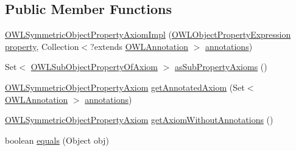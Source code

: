 \subsection*{Public Member Functions}
\begin{DoxyCompactItemize}
\item 
\hyperlink{classuk_1_1ac_1_1manchester_1_1cs_1_1owl_1_1owlapi_1_1_o_w_l_symmetric_object_property_axiom_impl_ab8c5ea0702345484e1981a1626f501de}{O\-W\-L\-Symmetric\-Object\-Property\-Axiom\-Impl} (\hyperlink{interfaceorg_1_1semanticweb_1_1owlapi_1_1model_1_1_o_w_l_object_property_expression}{O\-W\-L\-Object\-Property\-Expression} \hyperlink{classuk_1_1ac_1_1manchester_1_1cs_1_1owl_1_1owlapi_1_1_o_w_l_object_property_characteristic_axiom_impl_ac99438140edc10b050c93559f367cdbb}{property}, Collection$<$?extends \hyperlink{interfaceorg_1_1semanticweb_1_1owlapi_1_1model_1_1_o_w_l_annotation}{O\-W\-L\-Annotation} $>$ \hyperlink{classuk_1_1ac_1_1manchester_1_1cs_1_1owl_1_1owlapi_1_1_o_w_l_axiom_impl_af6fbf6188f7bdcdc6bef5766feed695e}{annotations})
\item 
Set$<$ \hyperlink{interfaceorg_1_1semanticweb_1_1owlapi_1_1model_1_1_o_w_l_sub_object_property_of_axiom}{O\-W\-L\-Sub\-Object\-Property\-Of\-Axiom} $>$ \hyperlink{classuk_1_1ac_1_1manchester_1_1cs_1_1owl_1_1owlapi_1_1_o_w_l_symmetric_object_property_axiom_impl_a642b79455b05e59706959ab2006b14a5}{as\-Sub\-Property\-Axioms} ()
\item 
\hyperlink{interfaceorg_1_1semanticweb_1_1owlapi_1_1model_1_1_o_w_l_symmetric_object_property_axiom}{O\-W\-L\-Symmetric\-Object\-Property\-Axiom} \hyperlink{classuk_1_1ac_1_1manchester_1_1cs_1_1owl_1_1owlapi_1_1_o_w_l_symmetric_object_property_axiom_impl_a961f9091884a1b1ab22e8d564a9b668c}{get\-Annotated\-Axiom} (Set$<$ \hyperlink{interfaceorg_1_1semanticweb_1_1owlapi_1_1model_1_1_o_w_l_annotation}{O\-W\-L\-Annotation} $>$ \hyperlink{classuk_1_1ac_1_1manchester_1_1cs_1_1owl_1_1owlapi_1_1_o_w_l_axiom_impl_af6fbf6188f7bdcdc6bef5766feed695e}{annotations})
\item 
\hyperlink{interfaceorg_1_1semanticweb_1_1owlapi_1_1model_1_1_o_w_l_symmetric_object_property_axiom}{O\-W\-L\-Symmetric\-Object\-Property\-Axiom} \hyperlink{classuk_1_1ac_1_1manchester_1_1cs_1_1owl_1_1owlapi_1_1_o_w_l_symmetric_object_property_axiom_impl_a1b5c2d819a5a74206cc17861a627e2f0}{get\-Axiom\-Without\-Annotations} ()
\item 
boolean \hyperlink{classuk_1_1ac_1_1manchester_1_1cs_1_1owl_1_1owlapi_1_1_o_w_l_symmetric_object_property_axiom_impl_a275af7f3e7fc3da247a74c018febee13}{equals} (Object obj)

\end{DoxyCompactItemize}
